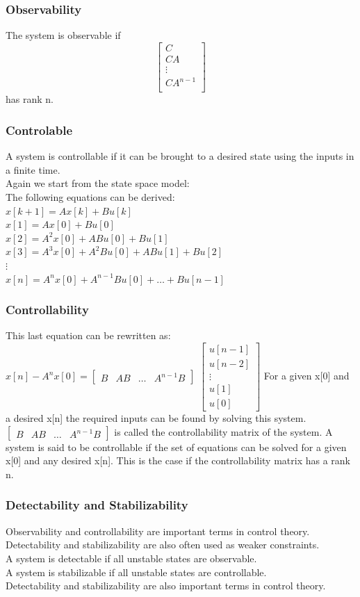 \begin{frame}
	\frametitle{Observability}
	The system is observable if 
	\[	\begin{bmatrix}
		C\\
		CA\\
		\vdots\\
		CA^{n-1}\\
	\end{bmatrix} \] has rank n.
\end{frame}
\begin{frame}
	\frametitle{Controlable}
	A system is controllable if it can be brought to a desired state using the inputs in a finite time.\\
	Again we start from the state space model:\\
	The following equations can be derived:\\
	$x[k+1] = A x[k] +Bu[k]$\\
	$x[1] = Ax[0]+Bu[0]$\\
	$x[2] = A^2 x[0] + ABu[0] + Bu[1]$\\
	$x[3] = A^3 x[0] + A^2Bu[0]+AB u[1] + Bu[2]$\\
	$\vdots$\\
	$x[n] = A^{n}x[0]+A^{n-1}Bu[0] + \dots + Bu[n-1]$
\end{frame}
\begin{frame}
	\frametitle{Controllability}
	This last equation can be rewritten as:
	$x[n] - A^{n}x[0] = \begin{bmatrix}
	B & AB & \dots & A^{n-1}B
	\end{bmatrix}$ $
	\begin{bmatrix}
	u[n-1]\\
	u[n-2]\\
	\vdots\\
	u[1]\\
	u[0]
	\end{bmatrix}
	 $	
	For a given x[0] and a desired x[n] the required inputs can be found by solving this system.
	$\begin{bmatrix}
		B & AB & \dots & A^{n-1}B
	\end{bmatrix}$ is called the controllability matrix of the system.
	A system is said to be controllable if the set of equations can be solved for a given x[0] and any desired x[n].
	This is the case if the controllability matrix has a rank n.
	
\end{frame}
\begin{frame}
	\frametitle{Detectability and Stabilizability}
	Observability and controllability are important terms in control theory.\\
	Detectability and stabilizability are also often used as weaker constraints.\\
	A system is detectable if all unstable states are observable.\\
	A system is stabilizable if all unstable states are controllable.\\
	Detectability and stabilizability are also important terms in control theory.\\
\end{frame}
